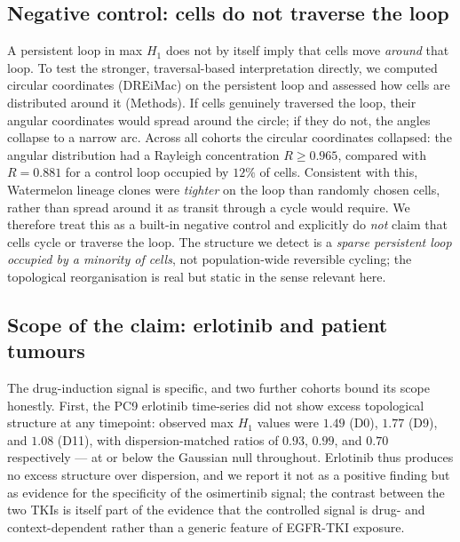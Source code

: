 \subsection*{Negative control: cells do not traverse the loop}

A persistent loop in max $H_1$ does not by itself imply that cells move
\emph{around} that loop. To test the stronger, traversal-based
interpretation directly, we computed circular coordinates (DREiMac) on
the persistent loop and assessed how cells are distributed around it
(Methods). If cells genuinely traversed the loop, their angular
coordinates would spread around the circle; if they do not, the angles
collapse to a narrow arc. Across all cohorts the circular coordinates
collapsed: the angular distribution had a Rayleigh concentration
$R \geq 0.965$, compared with $R = 0.881$ for a control loop occupied by
$12\%$ of cells. Consistent with this, Watermelon lineage clones were
\emph{tighter} on the loop than randomly chosen cells, rather than spread
around it as transit through a cycle would require. We therefore treat
this as a built-in negative control and explicitly do \emph{not} claim
that cells cycle or traverse the loop. The structure we detect is a
\emph{sparse persistent loop occupied by a minority of cells}, not
population-wide reversible cycling; the topological reorganisation is real
but static in the sense relevant here.

\subsection*{Scope of the claim: erlotinib and patient tumours}

The drug-induction signal is specific, and two further cohorts bound its
scope honestly. First, the PC9 erlotinib time-series did not show excess
topological structure at any timepoint: observed max $H_1$ values were
$1.49$ (D0), $1.77$ (D9), and $1.08$ (D11), with dispersion-matched
ratios of $0.93$, $0.99$, and $0.70$ respectively --- at or below the
Gaussian null throughout. Erlotinib thus produces no excess structure
over dispersion, and we report it not as a positive finding but as
evidence for the specificity of the osimertinib signal; the contrast
between the two TKIs is itself part of the evidence that the controlled
signal is drug- and context-dependent rather than a generic feature of
EGFR-TKI exposure.

